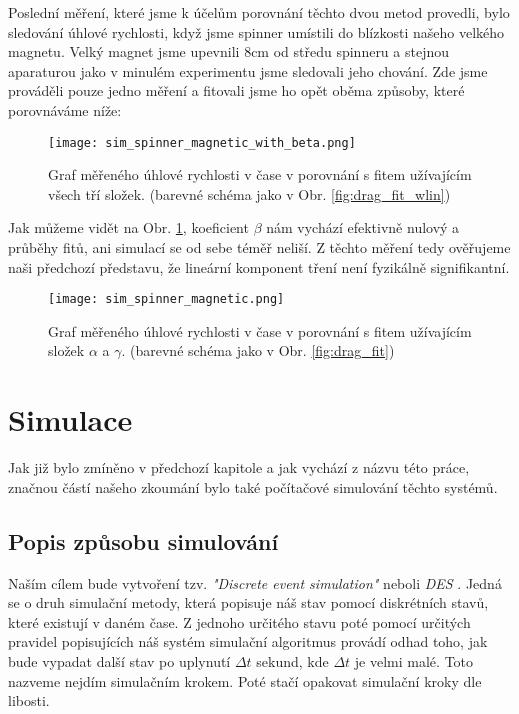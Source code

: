 \documentclass[12pt, a4paper,
 twoside,        %
 openright
]{report}
\begin{document}
Poslední měření, které jsme k účelům porovnání těchto dvou metod provedli, bylo sledování úhlové rychlosti, když jsme spinner umístili do blízkosti našeho velkého magnetu. Velký magnet jsme upevnili 8cm od středu spinneru a stejnou aparaturou jako v minulém experimentu jsme sledovali jeho chování. Zde jsme prováděli pouze jedno měření a fitovali jsme ho opět oběma způsoby, které porovnáváme níže:
\begin{figure}[H]
    \texttt{[image: sim\_spinner\_magnetic\_with\_beta.png]}
    \centering
    \caption[Příklad grafu měřeného průběhu $\omega$ v $t$ s $\beta \neq 0$ v magnetickém poli]{Graf měřeného úhlové rychlosti v čase v porovnání s fitem užívajícím všech tří složek. (barevné schéma jako v Obr. \ref{fig:drag_fit_wlin})}
    \label{fig:drag_fit_mag_wlin}
\end{figure}
Jak můžeme vidět na Obr. \ref{fig:drag_fit_mag_wlin}, koeficient $\beta$ nám vychází efektivně nulový a průběhy fitů, ani simulací se od sebe téměř neliší.
Z těchto měření tedy ověřujeme naši předchozí představu, že lineární komponent tření není fyzikálně signifikantní.
\begin{figure}[H]
    \texttt{[image: sim\_spinner\_magnetic.png]}
    \centering
    \caption[Příklad grafu měřeného průběhu $\omega$ v $t$ s $\beta = 0$ v magnetickém poli]{Graf měřeného úhlové rychlosti v čase v porovnání s fitem užívajícím složek $\alpha$ a $\gamma$. (barevné schéma jako v Obr. \ref{fig:drag_fit})}
    \label{fig:drag_fit_mag}
\end{figure}

\chapter{Simulace}
\label{chap:sim}

Jak již bylo zmíněno v předchozí kapitole a jak vychází z názvu této práce, značnou částí našeho zkoumání bylo také počítačové simulování těchto systémů.

\section{Popis způsobu simulování}

Naším cílem bude vytvoření tzv. \textit{"Discrete event simulation"} neboli \textit{DES} \cite{sim_methods}. Jedná se o druh simulační metody, která popisuje náš stav pomocí diskrétních stavů, které existují v daném čase. Z jednoho určitého stavu poté pomocí určitých pravidel popisujících náš systém simulační algoritmus provádí odhad toho, jak bude vypadat další stav po uplynutí $\Delta t$ sekund, kde $\Delta t$ je velmi malé. Toto nazveme nejdím simulačním krokem. Poté stačí opakovat simulační kroky dle libosti.
\end{document}
